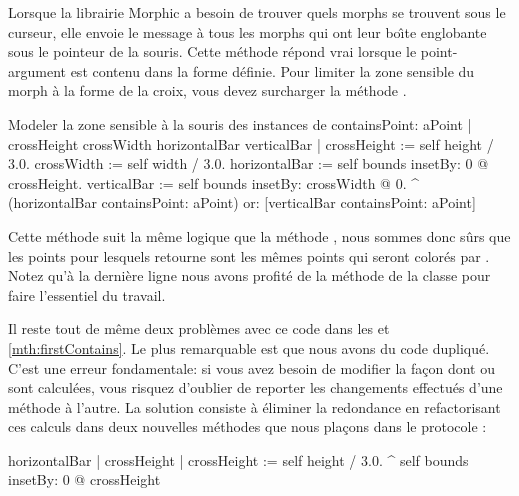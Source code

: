 \documentclass[a4paper,10pt,twoside]{book}
\begin{document}
Lorsque la librairie Morphic a besoin de trouver quels morphs se
trouvent sous le curseur, elle envoie le message 
 \`a tous les morphs qui ont leur bo\^{\i}te englobante sous le
pointeur de la souris. 
Cette m\'ethode r\'epond vrai lorsque le point-argument est contenu dans la
forme d\'efinie.
Pour limiter la zone sensible du morph \`a la forme de la croix, vous
devez surcharger la m\'ethode .


\begin{method}[firstContains]{Modeler la zone sensible \`a la souris des instances de }
containsPoint: aPoint
	| crossHeight crossWidth horizontalBar verticalBar |
	crossHeight := self height / 3.0.
	crossWidth := self width / 3.0.
	horizontalBar := self bounds insetBy: 0 @ crossHeight.
	verticalBar := self bounds insetBy: crossWidth @ 0.
	^ (horizontalBar containsPoint: aPoint)
		or: [verticalBar containsPoint: aPoint]
\end{method}

Cette m\'ethode suit la m\^eme logique que la m\'ethode , 
nous sommes donc s\^urs que les points pour lesquels
 retourne  sont les m\^emes points qui
seront color\'es par .
Notez qu'\`a 
la derni\`ere ligne
nous avons profit\'e de la m\'ethode
de la classe  pour faire l'essentiel du travail.

Il reste tout de m\^eme deux probl\`emes avec ce code dans les 
 et \ref{mth:firstContains}.
Le plus remarquable est que nous avons du code dupliqu\'e.
C'est une erreur fondamentale: si vous avez besoin de modifier la
fa\c{c}on dont  ou  sont
calcul\'ees, vous risquez d'oublier de reporter les changements
effectu\'es d'une m\'ethode \`a l'autre.
La solution consiste \`a \'eliminer la redondance en refactorisant ces
calculs dans deux nouvelles m\'ethodes que nous pla\c{c}ons dans le
protocole :

\begin{method}{}
horizontalBar
	| crossHeight |
	crossHeight := self height / 3.0.
	^ self bounds insetBy: 0 @ crossHeight
\end{method}
\end{document}

